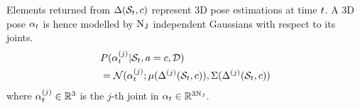 Elements returned from $\Delta(\mathcal{S}_{t}, c)$ represent 3D pose estimations at time $t$. A 3D pose $\mathbf{\alpha}_{t}$ is hence modelled by $\mathrm{N_{J}}$ independent Gaussians with respect to its joints. 
\begin{equation}
	\begin{split}
		& P( \mathbf{\alpha}^{(j)}_{t}| \mathcal{S}_{t}, a = c,\mathcal{D}) \\ 
	 & = \mathcal{N}(\mathbf{\alpha}^{(j)}_{t}; \mu(\Delta^{(j)}(\mathcal{S}_{t},c)), \Sigma(\Delta^{(j)}(\mathcal{S}_{t},c))
\end{split} 
\end{equation}
where $\mathbf{\alpha}_{t}^{(j)}\in\mathbb{R}^{3}$ is the $j$-th joint in $\mathbf{\alpha}_{t}\in\mathbb{R}^{3\mathrm{N_{J}}}$.
